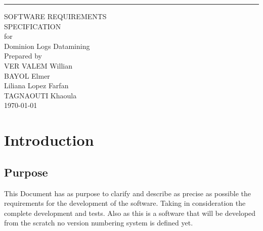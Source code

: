\documentclass{scrreprt}
\date{}
\begin{document}
\begin{flushright}
    \rule{16cm}{5pt}\vskip1cm
    \begin{bfseries}
        \Huge{SOFTWARE REQUIREMENTS\\ SPECIFICATION}\\
        \vspace{1.9cm}
        for\\
        \vspace{1.9cm}
        Dominion Logs Datamining\\
        \vspace{1.9cm}
        Prepared by \\ VER VALEM Willian \\ BAYOL Elmer \\ Liliana Lopez Farfan \\ TAGNAOUTI Khaoula\\
        \vspace{1.9cm}
        \today\\
    \end{bfseries}
\end{flushright}

\tableofcontents




\chapter{Introduction}

\section{Purpose}
This Document has as purpose to clarify and describe as precise as possible the
requirements for the development of the software.
Taking in consideration the complete development and tests.
Also as this is a software that will be developed from the scratch no version
numbering system is defined yet.
\end{document}
